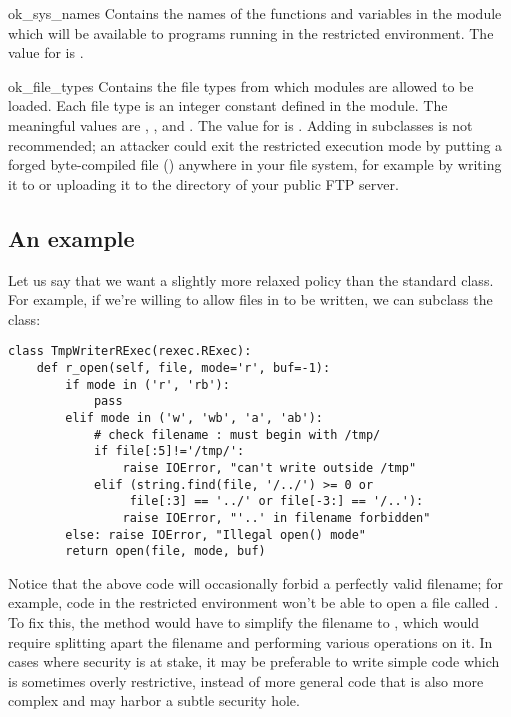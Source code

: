 \begin{memberdesc}{ok_sys_names}
Contains the names of the functions and variables in the 
module which will be available to programs running in the restricted
environment.  The value for  is .
\end{memberdesc}

\begin{memberdesc}{ok_file_types}
Contains the file types from which modules are allowed to be loaded.
Each file type is an integer constant defined in the  module.
The meaningful values are , , and
.  The value for  is .  Adding  in subclasses is not recommended;
an attacker could exit the restricted execution mode by putting a forged
byte-compiled file () anywhere in your file system, for example
by writing it to  or uploading it to the 
directory of your public FTP server.
\end{memberdesc}


\subsection{An example}

Let us say that we want a slightly more relaxed policy than the
standard  class.  For example, if we're willing to allow
files in  to be written, we can subclass the 
class:

\begin{verbatim}
class TmpWriterRExec(rexec.RExec):
    def r_open(self, file, mode='r', buf=-1):
        if mode in ('r', 'rb'):
            pass
        elif mode in ('w', 'wb', 'a', 'ab'):
            # check filename : must begin with /tmp/
            if file[:5]!='/tmp/': 
                raise IOError, "can't write outside /tmp"
            elif (string.find(file, '/../') >= 0 or
                 file[:3] == '../' or file[-3:] == '/..'):
                raise IOError, "'..' in filename forbidden"
        else: raise IOError, "Illegal open() mode"
        return open(file, mode, buf)
\end{verbatim}
%
Notice that the above code will occasionally forbid a perfectly valid
filename; for example, code in the restricted environment won't be
able to open a file called .  To fix this, the
 method would have to simplify the filename to
, which would require splitting apart the filename and
performing various operations on it.  In cases where security is at
stake, it may be preferable to write simple code which is sometimes
overly restrictive, instead of more general code that is also more
complex and may harbor a subtle security hole.
